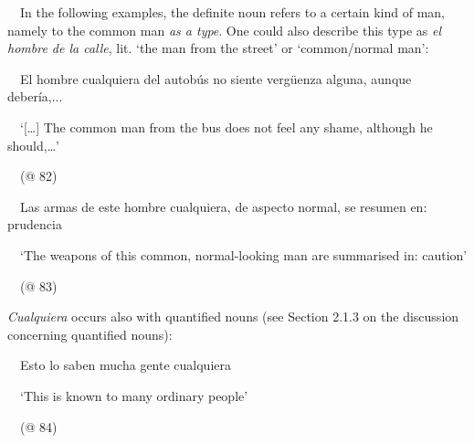 \begin{styleStandard}
\ \ In the following examples, the definite noun refers to a certain kind of man, namely to the common man \textit{as a type}. One could also describe this type as \textit{el hombre de la calle}, lit. ‘the man from the street’ or ‘common/normal man’:
\end{styleStandard}

\begin{styleStandard}
\ \ El hombre cualquiera del autobús no siente vergüenza alguna, aunque debería,...
\end{styleStandard}

\begin{styleStandard}
\ \ ‘[…] The common man from the bus does not feel any shame, although he should,…’
\end{styleStandard}

\begin{styleStandard}
\ \ (@ 82)
\end{styleStandard}

\begin{styleStandard}
\ \ Las armas de este hombre cualquiera, de aspecto normal, se resumen en: prudencia
\end{styleStandard}

\begin{styleStandard}
\ \ ‘The weapons of this common, normal-looking man are summarised in: caution’
\end{styleStandard}

\begin{styleStandard}
\ \ (@ 83)
\end{styleStandard}

\begin{styleStandard}
\textit{Cualquiera} occurs also with quantified nouns (see Section 2.1.3 on the discussion concerning quantified nouns):
\end{styleStandard}

\begin{styleStandard}
\label{bkm:Ref58144031}\ \ Esto lo saben mucha gente cualquiera 
\end{styleStandard}

\begin{styleStandard}
\ \ ‘This is known to many ordinary people’
\end{styleStandard}

\begin{styleStandard}
\ \ (@ 84)
\end{styleStandard}

